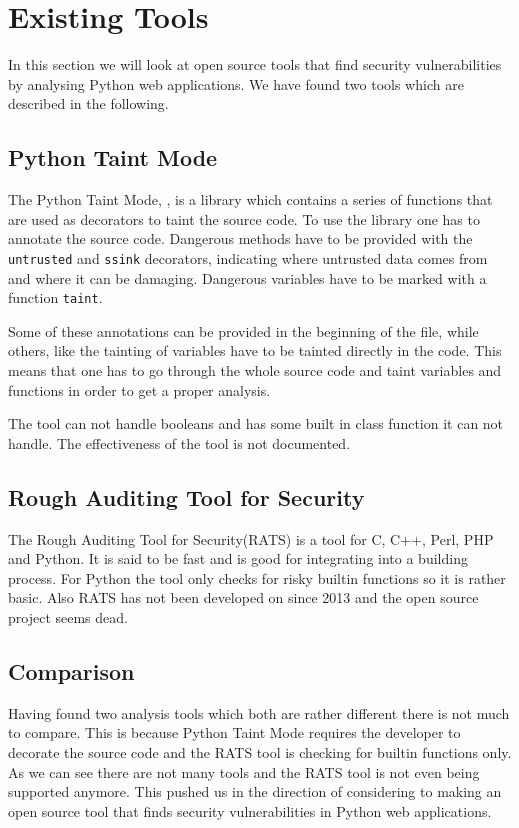 \section{Existing Tools}\label{existing_tools}
In this section we will look at open source tools that find security vulnerabilities by analysing Python web applications.
We have found two tools which are described in the following.

\subsection{Python Taint Mode}
The Python Taint Mode, \citet{conti2010taint}, is a library which contains a series of functions that are used as decorators to taint the source code.
To use the library one has to annotate the source code.
Dangerous methods have to be provided with the \texttt{untrusted} and \texttt{ssink} decorators, indicating where untrusted data comes from and where it can be damaging.
Dangerous variables have to be marked with a function \texttt{taint}.

Some of these annotations can be provided in the beginning of the file, while others, like the tainting of variables have to be tainted directly in the code.
This means that one has to go through the whole source code and taint variables and functions in order to get a proper analysis.

The tool can not handle booleans and has some built in class function it can not handle.
The effectiveness of the tool is not documented.

\subsection{Rough Auditing Tool for Security}
The Rough Auditing Tool for Security(RATS)\cite{rats} is a tool for C, C++, Perl, PHP and Python.
It is said to be fast and is good for integrating into a building process.
For Python the tool only checks for risky builtin functions so it is rather basic.
Also RATS has not been developed on since 2013 and the open source project seems dead.

\subsection{Comparison}
Having found two analysis tools which both are rather different there is not much to compare.
This is because Python Taint Mode requires the developer to decorate the source code and the RATS tool is checking for builtin functions only.
As we can see there are not many tools and the RATS tool is not even being supported anymore.
This pushed us in the direction of considering to making an open source tool that finds security vulnerabilities in Python web applications.
